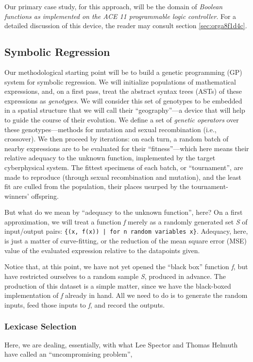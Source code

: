 \documentclass[11pt]{article}
\begin{document}
Our primary case study, for this approach, will be the domain of \emph{Boolean functions as implemented on the ACE 11 programmable logic controller}. For a detailed discussion of this device, the reader may consult section \ref{sec:orga8f1d4c}.

\subsection{Symbolic Regression}
\label{sec:orgceca113}
Our methodological starting point will be to build a genetic programming (GP) system for symbolic regression. We will initialize populations of mathematical expressions, and, on a first pass, treat the abstract syntax trees (ASTs) of these expressions as \emph{genotypes}. We will consider this set of genotypes to be embedded in a spatial structure that we will call their ``geography''---a device that will help to guide the course of their evolution. We define a set of \emph{genetic operators} over these genotypes---methods for mutation and sexual recombination (i.e., crossover). We then proceed by iterations: on each turn, a random batch of nearby expressions are to be evaluated for their ``fitness''---which here means their relative adequacy to the unknown function, implemented by the target cyberphysical system. The fittest specimens of each batch, or ``tournament'', are made to reproduce (through sexual recombination and mutation), and the least fit are culled from the population, their places usurped by the tournament-winners' offspring.

But what do we mean by ``adequacy to the unknown function'', here? On a first approximation, we will treat a function \emph{f} merely as a randomly generated set \emph{S} of input/output pairs: \texttt{\{(x, f(x)) | for n random variables x\}}. Adequacy, here, is just a matter of curve-fitting, or the reduction of the mean square error (MSE) value of the evaluated expression relative to the datapoints given.

Notice that, at this point, we have not yet opened the ``black box'' function \emph{f}, but have restricted ourselves to a random sample \emph{S}, produced in advance. The production of this dataset is a simple matter, since we have the black-boxed implementation of \emph{f} already in hand. All we need to do is to generate the random inputs, feed those inputs to \emph{f}, and record the outputs.

\subsubsection{Lexicase Selection}
\label{sec:orgd1bac03}
Here, we are dealing, essentially, with what Lee Spector and Thomas Helmuth have called an ``uncompromising problem'',
\end{document}
